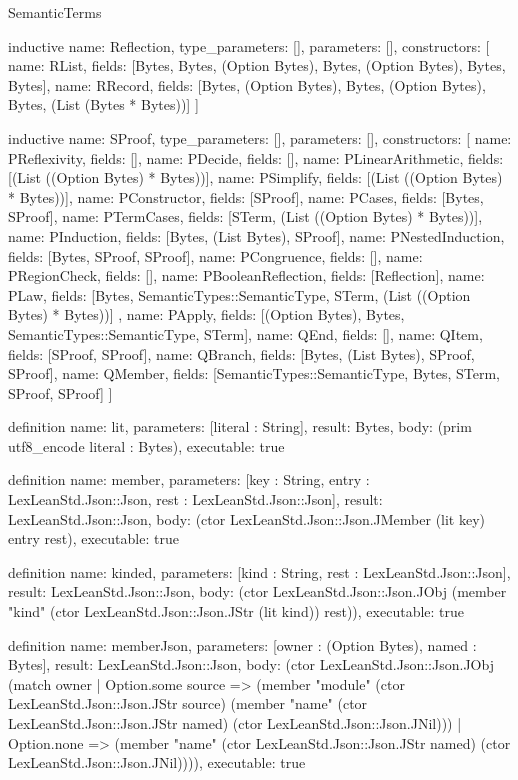 \begin{lexlean}{SemanticTerms}
\begin{semanticmodule}
inductive{
  name: Reflection,
  type_parameters: [],
  parameters: [],
  constructors: [
    {name: RList, fields: [Bytes, Bytes, (Option Bytes), Bytes, (Option Bytes), Bytes, Bytes]},
    {
      name: RRecord,
      fields: [Bytes, (Option Bytes), Bytes, (Option Bytes), Bytes, (List (Bytes * Bytes))]
    }
  ]
}

inductive{
  name: SProof,
  type_parameters: [],
  parameters: [],
  constructors: [
    {name: PReflexivity, fields: []},
    {name: PDecide, fields: []},
    {name: PLinearArithmetic, fields: [(List ((Option Bytes) * Bytes))]},
    {name: PSimplify, fields: [(List ((Option Bytes) * Bytes))]},
    {name: PConstructor, fields: [SProof]},
    {name: PCases, fields: [Bytes, SProof]},
    {name: PTermCases, fields: [STerm, (List ((Option Bytes) * Bytes))]},
    {name: PInduction, fields: [Bytes, (List Bytes), SProof]},
    {name: PNestedInduction, fields: [Bytes, SProof, SProof]},
    {name: PCongruence, fields: []},
    {name: PRegionCheck, fields: []},
    {name: PBooleanReflection, fields: [Reflection]},
    {
      name: PLaw,
      fields: [Bytes, SemanticTypes::SemanticType, STerm, (List ((Option Bytes) * Bytes))]
    },
    {name: PApply, fields: [(Option Bytes), Bytes, SemanticTypes::SemanticType, STerm]},
    {name: QEnd, fields: []},
    {name: QItem, fields: [SProof, SProof]},
    {name: QBranch, fields: [Bytes, (List Bytes), SProof, SProof]},
    {name: QMember, fields: [SemanticTypes::SemanticType, Bytes, STerm, SProof, SProof]}
  ]
}

definition{
  name: lit,
  parameters: [literal : String],
  result: Bytes,
  body: (prim utf8_encode literal : Bytes),
  executable: true
}

definition{
  name: member,
  parameters: [key : String, entry : LexLeanStd.Json::Json, rest : LexLeanStd.Json::Json],
  result: LexLeanStd.Json::Json,
  body: (ctor LexLeanStd.Json::Json.JMember (lit key) entry rest),
  executable: true
}

definition{
  name: kinded,
  parameters: [kind : String, rest : LexLeanStd.Json::Json],
  result: LexLeanStd.Json::Json,
  body: (ctor LexLeanStd.Json::Json.JObj (member "kind" (ctor LexLeanStd.Json::Json.JStr (lit kind)) rest)),
  executable: true
}

definition{
  name: memberJson,
  parameters: [owner : (Option Bytes), named : Bytes],
  result: LexLeanStd.Json::Json,
  body: (ctor LexLeanStd.Json::Json.JObj (match owner
    | Option.some source => (member "module" (ctor LexLeanStd.Json::Json.JStr source) (member "name" (ctor LexLeanStd.Json::Json.JStr named) (ctor LexLeanStd.Json::Json.JNil)))
    | Option.none => (member "name" (ctor LexLeanStd.Json::Json.JStr named) (ctor LexLeanStd.Json::Json.JNil)))),
  executable: true
}


\end{semanticmodule}
\end{lexlean}
